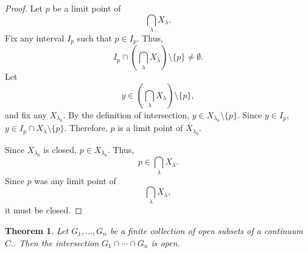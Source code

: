 \documentclass{amsart}
\newtheorem{theorem}{Theorem}
\newcommand{\1}{\mathds{1}}
\numberwithin{equation}{section}
\numberwithin{theorem}{section}
\begin{document}
\begin{proof}
	Let $p$ be a limit point of $$\bigcap_{\lambda} X_{\lambda}.$$ Fix any interval $I_p$ such that $p\in I_p$. Thus, $$I_p \cap \left( \bigcap_{\lambda} X_{\lambda} \right) \setminus \{p\} \not= \emptyset.$$
	Let $$y\in \left( \bigcap_{\lambda} X_{\lambda} \right) \setminus \{p\},$$
	and fix any $X_{\lambda_0}$. By the definition of intersection, $y\in X_{\lambda_0}\setminus \{p\}$. Since $y\in I_p$, $y\in I_p \cap X_{\lambda}\setminus \{p\}$. Therefore, $p$ is a limit point of $X_{\lambda_0}$. 
	
	Since $X_{\lambda_0}$ is closed, $p\in X_{\lambda_0}$. Thus, $$p\in \bigcap_{\lambda} X_{\lambda}.$$ Since $p$ was any limit point of  $$\bigcap_{\lambda} X_{\lambda},$$ it must be closed.
\end{proof}

\begin{theorem} \label{*} Let $G_1, \dotsc, G_n$ be a finite collection of open subsets of a continuum $C.$.  Then the intersection $G_1 \cap \dotsm \cap G_n$ is open.
\end{theorem}
\end{document}
